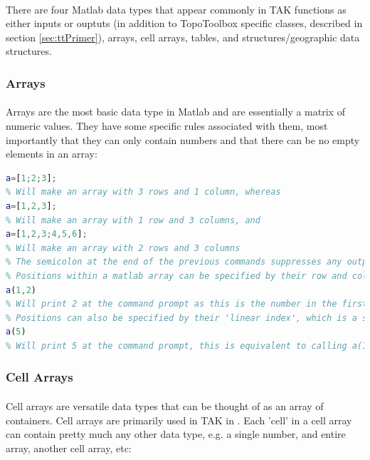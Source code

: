 \paragraph{}There are four Matlab data types that appear commonly in TAK functions as either inputs or ouptuts (in addition to TopoToolbox specific classes, described in section \ref{sec:ttPrimer}), arrays, cell arrays, tables, and structures/geographic data structures.

\subsubsection{Arrays}
\paragraph{}Arrays are the most basic data type in Matlab and are essentially a matrix of numeric values. They have some specific rules associated with them, most importantly that they can only contain numbers and that there can be no empty elements in an array:

\begin{lstlisting}[language=Matlab]
% To make an array, values separated by semicolons indicate rows and values separated by commas indicate columns, and encasing them in brackets indicates that it is an array, so
a=[1;2;3];
% Will make an array with 3 rows and 1 column, whereas
a=[1,2,3];
% Will make an array with 1 row and 3 columns, and
a=[1,2,3;4,5,6];
% Will make an array with 2 rows and 3 columns
% The semicolon at the end of the previous commands suppresses any output to the command prompt
% Positions within a matlab array can be specified by their row and column position (note that the first index in Matlab is 1, not 0 like in C, Java, Python, etc), so calling
a(1,2)
% Will print 2 at the command prompt as this is the number in the first row and second column.
% Positions can also be specified by their 'linear index', which is a single number that starts counting from position (1,1) and proceeds down columns and then across rows, so
a(5) 
% Will print 5 at the command prompt, this is equivalent to calling a(1,3)
\end{lstlisting}

\subsubsection{Cell Arrays}
\paragraph{}Cell arrays are versatile data types that can be thought of as an array of containers. Cell arrays are primarily used in TAK in . Each 'cell' in a cell array can contain pretty much any other data type, e.g. a single number, and entire array, another cell array, etc:

